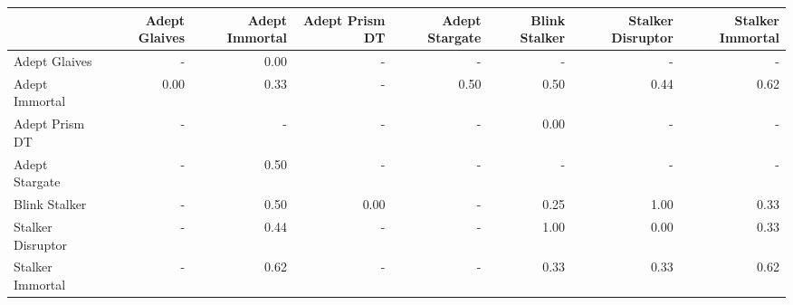 \begin{tabular}{lrrrrrrr}
\toprule
{} &  Adept Glaives &  Adept Immortal &  Adept Prism DT &  Adept Stargate &  Blink Stalker &  Stalker Disruptor &  Stalker Immortal \\
\midrule
Adept Glaives     &            - &            0.00 &             - &             - &            - &                - &               - \\
Adept Immortal    &           0.00 &            0.33 &             - &            0.50 &           0.50 &               0.44 &              0.62 \\
Adept Prism DT    &            - &             - &             - &             - &           0.00 &                - &               - \\
Adept Stargate    &            - &            0.50 &             - &             - &            - &                - &               - \\
Blink Stalker     &            - &            0.50 &            0.00 &             - &           0.25 &               1.00 &              0.33 \\
Stalker Disruptor &            - &            0.44 &             - &             - &           1.00 &               0.00 &              0.33 \\
Stalker Immortal  &            - &            0.62 &             - &             - &           0.33 &               0.33 &              0.62 \\
\bottomrule
\end{tabular}
